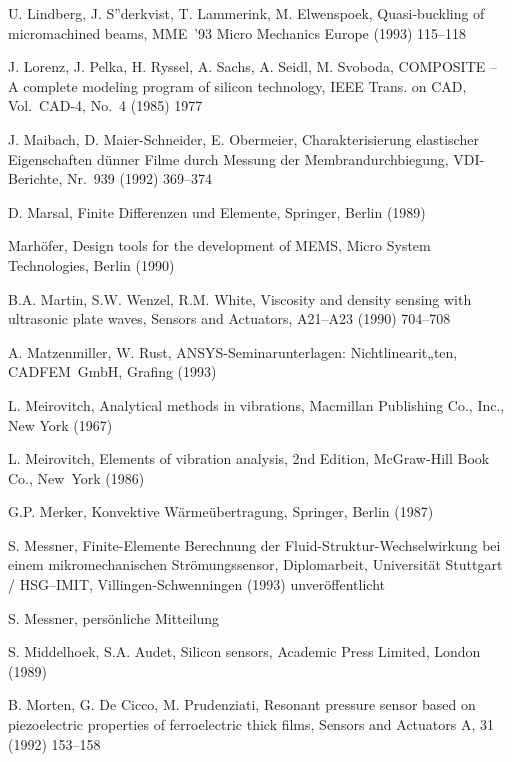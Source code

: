 \begin{thebibliography}{xxx}
 U. Lindberg, J. S”derkvist, T. Lammerink, M. Elwenspoek, Quasi-buckling of
 micromachined beams, MME~'93 Micro Mechanics Europe (1993) 115--118

 J. Lorenz, J. Pelka, H. Ryssel, A. Sachs, A. Seidl, M. Svoboda,
 {\sf COMPOSITE} -- A complete modeling program of silicon technology,
 IEEE Trans. on CAD, Vol.~CAD-4, No.~4 (1985) 1977

 J. Maibach, D. Maier-Schneider, E. Obermeier, Charakterisierung elastischer
 Eigenschaften dünner Filme durch Messung der Membrandurchbiegung,
 VDI-Berichte, Nr.~939 (1992) 369--374

 D. Marsal, Finite Differenzen und Elemente, Springer, Berlin (1989)

 Marhöfer, Design tools for the development of MEMS, Micro System
 Technologies, Berlin (1990)

 B.A. Martin, S.W. Wenzel, R.M. White, Viscosity and density sensing with
 ultrasonic plate waves, Sensors and Actuators, A21--A23 (1990) 704--708

 A. Matzenmiller, W. Rust, {\sf ANSYS}-Seminarunterlagen: Nichtlinearit„ten,
 CADFEM~GmbH, Grafing (1993)

 L. Meirovitch, Analytical methods in vibrations, Macmillan Publishing Co.,
 Inc., New York (1967)

 L. Meirovitch, Elements of vibration analysis, 2nd Edition, McGraw-Hill
 Book Co., New~York (1986)

 G.P. Merker, Konvektive Wärmeübertragung, Springer, Berlin (1987)

 S. Messner, Finite-Elemente Berechnung der Fluid-\-Struktur-\-Wechselwirkung
 bei einem mikromechanischen Strömungssensor, Diplomarbeit,
 Universität Stuttgart / HSG--IMIT, Villingen-Schwenningen (1993)
 unveröffentlicht

 S. Messner, persönliche Mitteilung

 S. Middelhoek, S.A. Audet, Silicon sensors, Academic Press Limited,
 London (1989)

 B. Morten, G. De Cicco, M. Prudenziati, Resonant pressure sensor based on
 piezoelectric properties of ferroelectric thick films, Sensors and
 Actuators A, 31 (1992) 153--158


\end{thebibliography}
